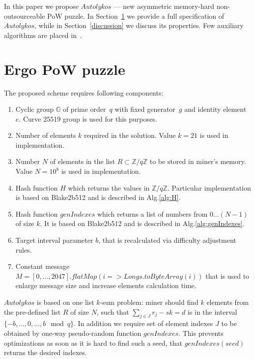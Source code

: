 \documentclass[]{article}
\newcommand{\Name}{$Autolykos$}
\begin{document}
    In this paper we propose \Name{} --- new asymmetric memory-hard non-outsourceable PoW puzzle.
    In Section~\ref{puzzle} we provide a full
    specification of \Name, while in Section~\ref{discussion} we discuss its
    properties. Few auxiliary algorithms are placed in~.

    \section{Ergo PoW puzzle}
    \label{puzzle}

    The proposed scheme requires following components:
    \begin{enumerate}
        \item Cyclic group $\mathbb{G}$ of prime order~$q$ with fixed generator~$g$
        and identity element~$e$.
        Curve 25519 group is used for this purposes.
        \item Number of elements $k$ required in the solution. Value $k=21$ is used in
            implementation.
        \item Number $N$ of elements in the list
            $R\subset\mathbb{Z}/q\mathbb{Z}$ to be stored in miner's memory.
            Value $N=10^8$ is used in implementation.
        \item Hash function $H$ which returns the values in $\mathbb{Z}/q\mathbb{Z}$.
        Particular implementation is based on Blake2b512 and is described in Alg.\ref{alg:H}.
        \item Hash function $genIndexes$ which returns a list of numbers from
            $0\dots(N-1)$ of size $k$.
        It is based on Blake2b512 and is described in Alg.\ref{alg:genIndexes}.
        \item Target interval parameter $b$, that is recalculated via difficulty adjustment rules.
        \item Constant message $M=[0,\dots,2047].flatMap(i => Longs.toByteArray(i))$ that is used to enlarge message size and increase elements calculation time.
    \end{enumerate}

    \Name{} is based on one list $k$-sum problem: miner should find
    $k$ elements from the pre-defined list $R$ of size $N$, such that
    $\sum_{j \in J} r_{j} - sk = d$ is in the interval $\{-b,\dots,0,\dots,b\mod q\}$.
    In addition we require set of element indexes $J$ to be obtained
    by one-way pseudo-random function $genIndexes$. This prevents optimizations as
    soon as it is hard to find such a seed,
    that $genIndexes(seed)$ returns the desired indexes.
\end{document}
